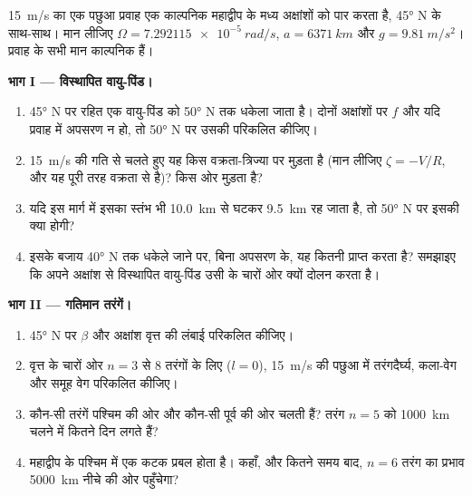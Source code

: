 \begin{problem}
\label{pb:b3:atmospheric-dynamics:1}
\qty{15}{m/s} का एक पछुआ प्रवाह एक काल्पनिक महाद्वीप के मध्य अक्षांशों को पार करता है,
\ang{45} N के साथ-साथ। मान लीजिए $\Omega =
\qty{7.292115e-5}{rad/s}$, $a = \qty{6371}{km}$ और $g = \qty{9.81}{m/s^2}$।
प्रवाह के सभी मान काल्पनिक हैं।

\medskip\noindent\textbf{भाग I --- विस्थापित वायु-पिंड।}
\begin{enumerate}
\item \ang{45} N पर  रहित एक वायु-पिंड को
  \ang{50} N तक धकेला जाता है। दोनों अक्षांशों पर $f$ और
  यदि प्रवाह में अपसरण न हो, तो \ang{50} N पर उसकी  परिकलित कीजिए।
\item \qty{15}{m/s} की गति से चलते हुए यह किस वक्रता-त्रिज्या पर मुड़ता है
  (मान लीजिए $\zeta = -V/R$, और यह पूरी तरह वक्रता से है)? किस ओर मुड़ता है?
\item यदि इस मार्ग में इसका स्तंभ भी \qty{10.0}{km} से घटकर \qty{9.5}{km} रह जाता है,
  तो \ang{50} N पर इसकी  क्या होगी?
\item इसके बजाय \ang{40} N तक धकेले जाने पर, बिना अपसरण के, यह
  कितनी  प्राप्त करता है? समझाइए कि अपने अक्षांश से विस्थापित वायु-पिंड
  उसी के चारों ओर क्यों दोलन करता है।
\end{enumerate}

\medskip\noindent\textbf{भाग II --- गतिमान तरंगें।}
\begin{enumerate}[resume]
\item \ang{45} N पर $\beta$ और अक्षांश वृत्त की लंबाई परिकलित कीजिए।
\item वृत्त के चारों ओर $n = 3$ से 8 तरंगों के लिए ($l = 0$),
  \qty{15}{m/s} की पछुआ में तरंगदैर्घ्य, कला-वेग
  और समूह वेग परिकलित कीजिए।
\item कौन-सी तरंगें पश्चिम की ओर और कौन-सी पूर्व की ओर चलती हैं? तरंग
  $n = 5$ को \qty{1000}{km} चलने में कितने दिन लगते हैं?
\item महाद्वीप के पश्चिम में एक कटक प्रबल होता है। कहाँ, और
  कितने समय बाद, $n = 6$ तरंग का प्रभाव \qty{5000}{km}
  नीचे की ओर पहुँचेगा?
\end{enumerate}


\end{problem}
